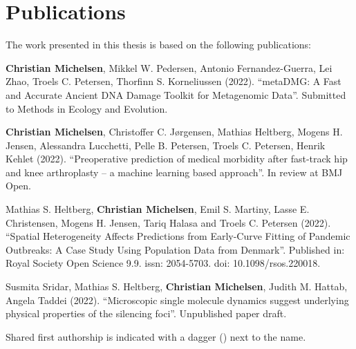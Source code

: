\chapter{Publications}

The work presented in this thesis is based on the following publications:

\vspace{0.5cm}

\begin{description} [labelindent=1cm,style=multiline,leftmargin=3cm]
	\item [Paper 1:] \textbf{Christian Michelsen}\textsuperscript{\textdagger}, Mikkel W. Pedersen\textsuperscript{\textdagger}, Antonio Fernandez-Guerra, Lei Zhao, Troels C. Petersen, Thorfinn S. Korneliussen (2022). ``metaDMG: A Fast and Accurate Ancient DNA Damage Toolkit for Metagenomic Data''. Submitted to Methods in Ecology and Evolution. \\
	\item [Paper 2:] \textbf{Christian Michelsen}\textsuperscript{\textdagger}, Christoffer C. Jørgensen\textsuperscript{\textdagger}, Mathias Heltberg, Mogens H. Jensen, Alessandra Lucchetti, Pelle B. Petersen, Troels C. Petersen, Henrik Kehlet (2022). ``Preoperative prediction of medical morbidity after fast-track hip and knee arthroplasty -- a machine learning based approach''. In review at BMJ Open. \\
	\item [Paper 3:] Mathias S. Heltberg\textsuperscript{\textdagger}, \textbf{Christian Michelsen}\textsuperscript{\textdagger}, Emil S. Martiny, Lasse E. Christensen, Mogens H. Jensen, Tariq Halasa and Troels C. Petersen (2022). ``Spatial Heterogeneity Affects Predictions from Early-Curve Fitting of Pandemic Outbreaks: A Case Study Using Population Data from Denmark''. Published in: Royal Society Open Science 9.9. issn: 2054-5703. doi: 10.1098/rsos.220018.  \\
	\item [Paper 4:] Susmita Sridar\textsuperscript{\textdagger}, Mathias S. Heltberg\textsuperscript{\textdagger}, \textbf{Christian Michelsen}\textsuperscript{\textdagger}, Judith M. Hattab, Angela Taddei (2022). ``Microscopic single molecule dynamics suggest underlying physical properties of the silencing foci''. Unpublished paper draft.
\end{description}


\vspace{0.5cm}
\noindent Shared first authorship is indicated with a dagger (\textdagger) next to the name. \\

